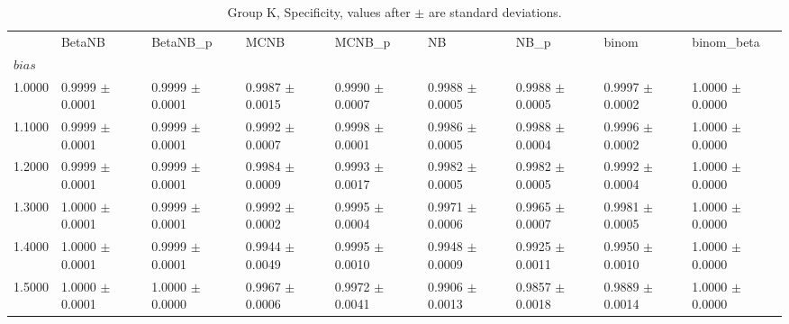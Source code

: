 \begin{table}[H]
\centering
\begin{adjustbox}{max width=\linewidth}
\begin{tabular}{lllllllll}
\toprule
 & BetaNB & BetaNB\_p & MCNB & MCNB\_p & NB & NB\_p & binom & binom\_beta \\
$bias$ &  &  &  &  &  &  &  &  \\
\midrule
1.0000 & 0.9999 $\pm$ 0.0001 & 0.9999 $\pm$ 0.0001 & 0.9987 $\pm$ 0.0015 & 0.9990 $\pm$ 0.0007 & 0.9988 $\pm$ 0.0005 & 0.9988 $\pm$ 0.0005 & 0.9997 $\pm$ 0.0002 & 1.0000 $\pm$ 0.0000 \\
1.1000 & 0.9999 $\pm$ 0.0001 & 0.9999 $\pm$ 0.0001 & 0.9992 $\pm$ 0.0007 & 0.9998 $\pm$ 0.0001 & 0.9986 $\pm$ 0.0005 & 0.9988 $\pm$ 0.0004 & 0.9996 $\pm$ 0.0002 & 1.0000 $\pm$ 0.0000 \\
1.2000 & 0.9999 $\pm$ 0.0001 & 0.9999 $\pm$ 0.0001 & 0.9984 $\pm$ 0.0009 & 0.9993 $\pm$ 0.0017 & 0.9982 $\pm$ 0.0005 & 0.9982 $\pm$ 0.0005 & 0.9992 $\pm$ 0.0004 & 1.0000 $\pm$ 0.0000 \\
1.3000 & 1.0000 $\pm$ 0.0001 & 0.9999 $\pm$ 0.0001 & 0.9992 $\pm$ 0.0002 & 0.9995 $\pm$ 0.0004 & 0.9971 $\pm$ 0.0006 & 0.9965 $\pm$ 0.0007 & 0.9981 $\pm$ 0.0005 & 1.0000 $\pm$ 0.0000 \\
1.4000 & 1.0000 $\pm$ 0.0001 & 0.9999 $\pm$ 0.0001 & 0.9944 $\pm$ 0.0049 & 0.9995 $\pm$ 0.0010 & 0.9948 $\pm$ 0.0009 & 0.9925 $\pm$ 0.0011 & 0.9950 $\pm$ 0.0010 & 1.0000 $\pm$ 0.0000 \\
1.5000 & 1.0000 $\pm$ 0.0001 & 1.0000 $\pm$ 0.0000 & 0.9967 $\pm$ 0.0006 & 0.9972 $\pm$ 0.0041 & 0.9906 $\pm$ 0.0013 & 0.9857 $\pm$ 0.0018 & 0.9889 $\pm$ 0.0014 & 1.0000 $\pm$ 0.0000 \\
\bottomrule
\end{tabular}

\end{adjustbox}
\caption{Group K, Specificity, values after $\pm$ are standard deviations.}
\end{table}

